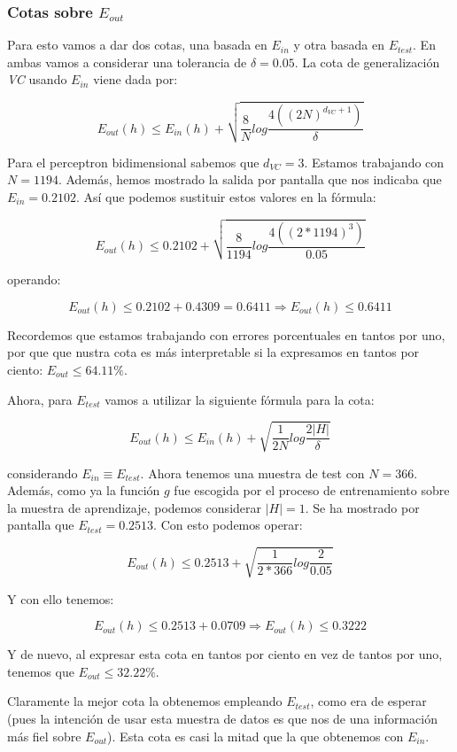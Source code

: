 \documentclass[11pt]{article}
\begin{document}
\subsubsection{Cotas sobre $E_{out}$}

Para esto vamos a dar dos cotas, una basada en $E_{in}$ y otra basada en $E_{test}$. En ambas vamos a considerar una tolerancia de $\delta = 0.05$. La cota de generalización \emph{VC} usando $E_{in}$ viene dada por:

$$E_{out}(h) \leq E_{in}(h) + \sqrt{\frac{8}{N} log\frac{4((2N)^{d_{VC} + 1})}{\delta}}$$

Para el perceptron bidimensional sabemos que $d_{VC} = 3$. Estamos trabajando con $N = 1194$. Además, hemos mostrado la salida por pantalla que nos indicaba que $E_{in} = 0.2102$. Así que podemos sustituir estos valores en la fórmula:

$$E_{out}(h) \leq 0.2102 + \sqrt{\frac{8}{1194} log\frac{4((2 * 1194)^{3})}{0.05}}$$

operando:

$$E_{out}(h) \leq 0.2102 + 0.4309 = 0.6411 \Rightarrow E_{out}(h) \leq 0.6411$$

Recordemos que estamos trabajando con errores porcentuales en tantos por uno, por que que nustra cota es más interpretable si la expresamos en tantos por ciento: $E_{out} \leq 64.11\%$.

Ahora, para $E_{test}$ vamos a utilizar la siguiente fórmula para la cota:

$$E_{out}(h) \leq E_{in}(h) + \sqrt{\frac{1}{2N} log\frac{2|H|}{\delta}}$$

considerando $E_{in} \equiv E_{test}$. Ahora tenemos una muestra de test con $N = 366$. Además, como ya la función $g$ fue escogida por el proceso de entrenamiento sobre la muestra de aprendizaje, podemos considerar $|H| = 1$. Se ha mostrado por pantalla que $E_{test} = 0.2513$. Con esto podemos operar:

$$E_{out}(h) \leq 0.2513 + \sqrt{\frac{1}{2 * 366} log\frac{2}{0.05}}$$

Y con ello tenemos:

$$E_{out}(h) \leq 0.2513 + 0.0709 \Rightarrow E_{out}(h) \leq 0.3222$$

Y de nuevo, al expresar esta cota en tantos por ciento en vez de tantos por uno, tenemos que $E_{out} \leq 32.22\%$.

Claramente la mejor cota la obtenemos empleando $E_{test}$, como era de esperar (pues la intención de usar esta muestra de datos es que nos de una información más fiel sobre $E_{out}$). Esta cota es casi la mitad que la que obtenemos con $E_{in}$.


\pagebreak



\end{document}
